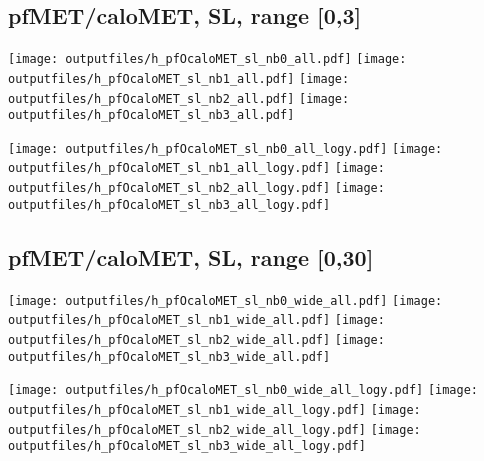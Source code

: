 \documentclass[11pt]{article}
\begin{document}
    \clearpage



    \subsection{ pfMET/caloMET, SL, range [0,3]}

    \noindent
     \texttt{[image: outputfiles/h\_pfOcaloMET\_sl\_nb0\_all.pdf]}
     \texttt{[image: outputfiles/h\_pfOcaloMET\_sl\_nb1\_all.pdf]}
     \texttt{[image: outputfiles/h\_pfOcaloMET\_sl\_nb2\_all.pdf]}
     \texttt{[image: outputfiles/h\_pfOcaloMET\_sl\_nb3\_all.pdf]}

    \noindent
     \texttt{[image: outputfiles/h\_pfOcaloMET\_sl\_nb0\_all\_logy.pdf]}
     \texttt{[image: outputfiles/h\_pfOcaloMET\_sl\_nb1\_all\_logy.pdf]}
     \texttt{[image: outputfiles/h\_pfOcaloMET\_sl\_nb2\_all\_logy.pdf]}
     \texttt{[image: outputfiles/h\_pfOcaloMET\_sl\_nb3\_all\_logy.pdf]}

    \clearpage




    \subsection{ pfMET/caloMET, SL, range [0,30]}

    \noindent
     \texttt{[image: outputfiles/h\_pfOcaloMET\_sl\_nb0\_wide\_all.pdf]}
     \texttt{[image: outputfiles/h\_pfOcaloMET\_sl\_nb1\_wide\_all.pdf]}
     \texttt{[image: outputfiles/h\_pfOcaloMET\_sl\_nb2\_wide\_all.pdf]}
     \texttt{[image: outputfiles/h\_pfOcaloMET\_sl\_nb3\_wide\_all.pdf]}

    \noindent
     \texttt{[image: outputfiles/h\_pfOcaloMET\_sl\_nb0\_wide\_all\_logy.pdf]}
     \texttt{[image: outputfiles/h\_pfOcaloMET\_sl\_nb1\_wide\_all\_logy.pdf]}
     \texttt{[image: outputfiles/h\_pfOcaloMET\_sl\_nb2\_wide\_all\_logy.pdf]}
     \texttt{[image: outputfiles/h\_pfOcaloMET\_sl\_nb3\_wide\_all\_logy.pdf]}

    \clearpage
\end{document}
